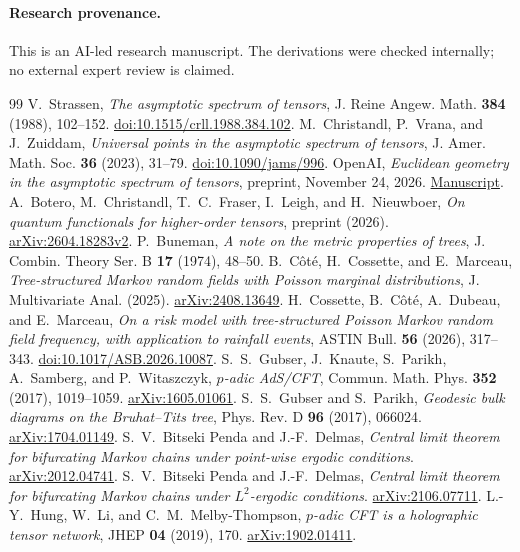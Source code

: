 \documentclass[11pt]{article}
\theoremstyle{remark}
\begin{document}
\paragraph{Research provenance.}
This is an AI-led research manuscript. The derivations were checked internally; no external expert review is claimed.

\clearpage
\begin{thebibliography}{99}
 V.~Strassen, \emph{The asymptotic spectrum of tensors},
 J. Reine Angew. Math. \textbf{384} (1988), 102--152.
 \href{https://doi.org/10.1515/crll.1988.384.102}{doi:10.1515/crll.1988.384.102}.
 M.~Christandl, P.~Vrana, and J.~Zuiddam, \emph{Universal points in the asymptotic spectrum of tensors}, J. Amer. Math. Soc. \textbf{36} (2023), 31--79.
 \href{https://doi.org/10.1090/jams/996}{doi:10.1090/jams/996}.
 OpenAI, \emph{Euclidean geometry in the asymptotic spectrum of tensors}, preprint, November 24, 2026.
 \href{https://github.com/openai/math/blob/main/preprints/Euclidean-geometry-in-the-asymptotic-spectrum-of-tensors-November-24-2026/paper.pdf}{Manuscript}.
 A.~Botero, M.~Christandl, T.~C.~Fraser, I.~Leigh, and H.~Nieuwboer,
 \emph{On quantum functionals for higher-order tensors}, preprint (2026).
 \href{https://arxiv.org/abs/2604.18283v2}{arXiv:2604.18283v2}.
 P.~Buneman, \emph{A note on the metric properties of trees},
 J. Combin. Theory Ser. B \textbf{17} (1974), 48--50.
 B.~C\^ot\'e, H.~Cossette, and E.~Marceau, \emph{Tree-structured Markov random fields with Poisson marginal distributions},
 J. Multivariate Anal. (2025).
 \href{https://arxiv.org/abs/2408.13649}{arXiv:2408.13649}.
 H.~Cossette, B.~C\^ot\'e, A.~Dubeau, and E.~Marceau, \emph{On a risk model with tree-structured Poisson Markov random field frequency, with application to rainfall events}, ASTIN Bull. \textbf{56} (2026), 317--343.
 \href{https://doi.org/10.1017/ASB.2026.10087}{doi:10.1017/ASB.2026.10087}.
 S.~S.~Gubser, J.~Knaute, S.~Parikh, A.~Samberg, and P.~Witaszczyk,
 \emph{\(p\)-adic AdS/CFT}, Commun. Math. Phys. \textbf{352} (2017), 1019--1059.
 \href{https://arxiv.org/abs/1605.01061}{arXiv:1605.01061}.
 S.~S.~Gubser and S.~Parikh, \emph{Geodesic bulk diagrams on the Bruhat--Tits tree},
 Phys. Rev. D \textbf{96} (2017), 066024.
 \href{https://arxiv.org/abs/1704.01149}{arXiv:1704.01149}.
 S.~V.~Bitseki Penda and J.-F.~Delmas, \emph{Central limit theorem for bifurcating Markov chains under point-wise ergodic conditions}.
 \href{https://arxiv.org/abs/2012.04741}{arXiv:2012.04741}.
 S.~V.~Bitseki Penda and J.-F.~Delmas, \emph{Central limit theorem for bifurcating Markov chains under \(L^2\)-ergodic conditions}.
 \href{https://arxiv.org/abs/2106.07711}{arXiv:2106.07711}.
 L.-Y.~Hung, W.~Li, and C.~M.~Melby-Thompson, \emph{\(p\)-adic CFT is a holographic tensor network}, JHEP \textbf{04} (2019), 170.
 \href{https://arxiv.org/abs/1902.01411}{arXiv:1902.01411}.
\end{thebibliography}
\end{document}
